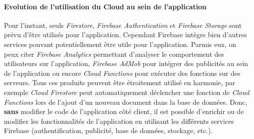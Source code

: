 \paragraph{Evolution de l'utilisation du Cloud au sein de l'application}
Pour l'instant, seuls \textit{Firestore}, \textit{Firebase Authentication} et \textit{Firebase Storage} sont prévu d'être utilisés pour l'application. Cependant Firebase intègre bien d'autres services pouvant potentiellement être utile pour l'application. Parmis eux, on peux citer \textit{Firebase Analytics} permettant d'analyser le comportement des utilisateurs sur l'application, \textit{Firebase AdMob} pour intégrer des publicités au sein de l'application ou encore \textit{Cloud Functions} pour exécuter des fonctions sur des serveurs. Tous ces produits peuvent être étroitement utilisé en harmonie, par exemple \textit{Cloud Firestore} peut automatiquement déclencher une fonction de \textit{Cloud Functions} lors de l'ajout d'un nouveau document dans la base de données. Donc, \textbf{sans} modifier le code de l'application côté client, il est possible d'enrichir ou de modifier les fonctionnalités de l'application en utilisant les différents services Firebase (authentification, publicité, base de données, stockage, etc.).
